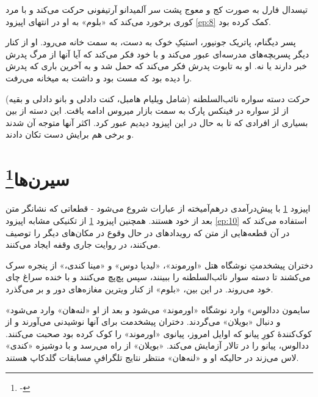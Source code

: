 \documentclass[12pt]{book}
\newcommand{\noun}[1]{«{#1}»}
\begin{document}
    تیسدال فارل به صورت کج و معوج پشت سر آلمیدانو آرتیفونی حرکت می‌کند و با مرد کوری برخورد می‌کند که \noun{بلوم} به او در انتهای اپیزود \ref{ep:8} کمک کرده بود.

    پسر دیگنام، پاتریک جونیور، استیکِ خوک به دست، به سمت خانه می‌رود. او از کنار دیگر پسربچه‌های مدرسه‌ای عبور می‌کند و با خود فکر می‌کند که آیا آنها از مرگ پدرش خبر دارند یا نه. او به تابوت پدرش فکر می‌کند که حمل شد و به آخرین باری که پدرش را دیده بود که مست بود و داشت به میخانه می‌رفت.

    حرکت دسته سواره نائب‌السلطنه (شامل ویلیام هامبل، کنت دادلی و بانو دادلی و بقیه) از لژ سواره در فینکس پارک به سمت بازار میروس ادامه یافت. این دسته از بین بسیاری از افرادی که تا به حال در این اپیزود دیدیم عبور کرد. اکثر آنها متوجه آن شدند و برخی هم برایش دست تکان دادند.

    \chapter[سیرن‌ها]{سیرن‌ها\protect\footnote{-}}\label{ep:11}
    اپیزود \ref{ep:11} با پیش‌درآمدی درهم‌آمیخته از عبارات شروع می‌شود - قطعاتی که نشانگر متن بعد از خود هستند. همچنین اپیزود \ref{ep:11} از تکنیکی مشابه اپیزود \ref{ep:10} استفاده می‌کند که در آن قطعه‌هایی از متن که رویدادهای در حال وقوع در مکان‌های دیگر را توصیف می‌کنند، در روایت جاری وقفه ایجاد می‌کنند.

    دختران پیشخدمتِ نوشگاه هتل \noun{اورموند}، \noun{لیدیا دوس} و \noun{مینا کندی،} از پنجره سرک می‌کشند تا دسته سوار نائب‌السلطنه را ببینند، سپس پچ‌پچ می‌کنند و با خنده سراغ چای خود می‌روند. در این بین، \noun{بلوم} از کنار ویترین مغازه‌های دور و بر می‌گذرد.

    \noun{سایمون ددالوس‬} وارد نوشگاه \noun{اورموند} می‌شود و بعد از او \noun{لنه‌هان} وارد می‌شود و دنبال \noun{بویلان} می‌گردند. دختران پیشخدمت برای آنها نوشیدنی می‌آورند و از کوک‌کنندۀ کورِ پیانو که اوایل امروز، پیانوی \noun{اورموند} را کوک کرده بود صحبت می‌کنند. ددالوس، پیانو را در تالار آزمایش می‌کند. \noun{بویلان} از راه می‌رسد و با دوشیزه \noun{کندی} لاس می‌زند در حالیکه او و \noun{لنه‌هان} منتظر نتایج تلگرافیِ مسابقات گلدکاپ هستند.
\end{document}
